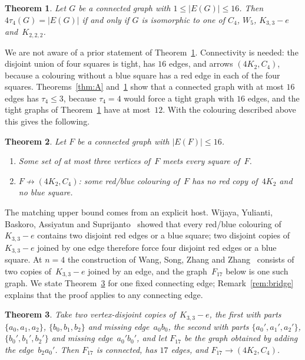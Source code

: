 \documentclass[11pt,letterpaper]{article}
\numberwithin{equation}{section}
\theoremstyle{plain}
\newtheorem{mainthm}{Theorem}
\theoremstyle{definition}
\theoremstyle{remark}
\newcommand{\Kme}{K_{3,3}-e}
\newcommand{\Oct}{K_{2,2,2}}
\begin{document}
\begin{mainthm}\label{thm:B}
Let $G$ be a connected graph with $1\le|E(G)|\le16$. Then $4\tau_4(G)=|E(G)|$ if and only if $G$ is isomorphic to one of $C_4$, $W_5$, $\Kme$ and~$\Oct$.
\end{mainthm}

We are not aware of a prior statement of Theorem~\ref{thm:B}. Connectivity is needed: the disjoint union of four squares is tight, has $16$ edges, and arrows $(4K_2,C_4)$, because a colouring without a blue square has a red edge in each of the four squares. Theorems~\ref{thm:A} and~\ref{thm:B} show that a connected graph with at most $16$ edges has $\tau_4\le3$, because $\tau_4=4$ would force a tight graph with $16$ edges, and the tight graphs of Theorem~\ref{thm:B} have at most~$12$. With the colouring described above this gives the following.

\begin{mainthm}\label{thm:C}
Let $F$ be a connected graph with $|E(F)|\le16$.
\begin{enumerate}[label=\textup{(\roman*)}]
\item\label{C:trans} Some set of at most three vertices of~$F$ meets every square of~$F$.
\item\label{C:col} $F\not\to(4K_2,C_4)$: some red/blue colouring of~$F$ has no red copy of~$4K_2$ and no blue square.
\end{enumerate}
\end{mainthm}

The matching upper bound comes from an explicit host. Wijaya, Yulianti, Baskoro, Assiyatun and Suprijanto~\cite[Theorem~2.6]{WYBAS15} showed that every red/blue colouring of~$\Kme$ contains two disjoint red edges or a blue square; two disjoint copies of~$\Kme$ joined by one edge therefore force four disjoint red edges or a blue square. At $n=4$ the construction of Wang, Song, Zhang and Zhang~\cite[Theorem~1.3]{WSZZ25} consists of two copies of~$\Kme$ joined by an edge, and the graph~$F_{17}$ below is one such graph. We state Theorem~\ref{thm:D} for one fixed connecting edge; Remark~\ref{rem:bridge} explains that the proof applies to any connecting edge.

\begin{mainthm}\label{thm:D}
Take two vertex-disjoint copies of~$\Kme$, the first with parts $\{a_0,a_1,a_2\}$, $\{b_0,b_1,b_2\}$ and missing edge~$a_0b_0$, the second with parts $\{a_0',a_1',a_2'\}$, $\{b_0',b_1',b_2'\}$ and missing edge~$a_0'b_0'$, and let $F_{17}$ be the graph obtained by adding the edge~$b_2a_0'$. Then $F_{17}$ is connected, has $17$ edges, and $F_{17}\to(4K_2,C_4)$.
\end{mainthm}
\end{document}
